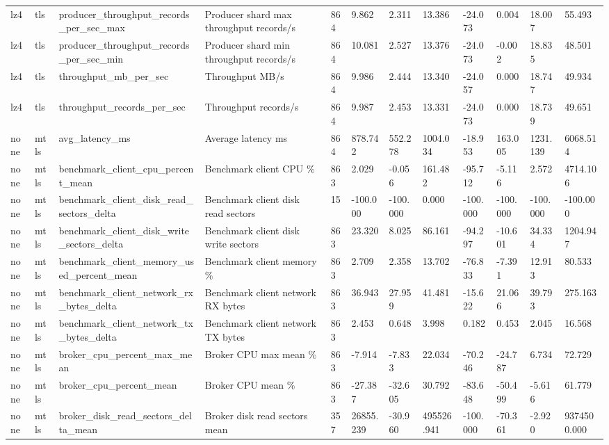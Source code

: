 \begin{longtable}{llllllllllll}
lz4 & tls & producer\_throughput\_records\_per\_sec\_max & Producer shard max throughput records/s & 864 & 9.862 & 2.311 & 13.386 & -24.073 & 0.004 & 18.007 & 55.493 \\
lz4 & tls & producer\_throughput\_records\_per\_sec\_min & Producer shard min throughput records/s & 864 & 10.081 & 2.527 & 13.376 & -24.073 & -0.002 & 18.835 & 48.501 \\
lz4 & tls & throughput\_mb\_per\_sec & Throughput MB/s & 864 & 9.986 & 2.444 & 13.340 & -24.057 & 0.000 & 18.747 & 49.934 \\
lz4 & tls & throughput\_records\_per\_sec & Throughput records/s & 864 & 9.987 & 2.453 & 13.331 & -24.073 & 0.000 & 18.739 & 49.651 \\
none & mtls & avg\_latency\_ms & Average latency ms & 864 & 878.742 & 552.278 & 1004.034 & -18.953 & 163.005 & 1231.139 & 6068.514 \\
none & mtls & benchmark\_client\_cpu\_percent\_mean & Benchmark client CPU \% & 863 & 2.029 & -0.056 & 161.482 & -95.712 & -5.116 & 2.572 & 4714.106 \\
none & mtls & benchmark\_client\_disk\_read\_sectors\_delta & Benchmark client disk read sectors & 15 & -100.000 & -100.000 & 0.000 & -100.000 & -100.000 & -100.000 & -100.000 \\
none & mtls & benchmark\_client\_disk\_write\_sectors\_delta & Benchmark client disk write sectors & 863 & 23.320 & 8.025 & 86.161 & -94.297 & -10.601 & 34.334 & 1204.947 \\
none & mtls & benchmark\_client\_memory\_used\_percent\_mean & Benchmark client memory \% & 863 & 2.709 & 2.358 & 13.702 & -76.833 & -7.391 & 12.913 & 80.533 \\
none & mtls & benchmark\_client\_network\_rx\_bytes\_delta & Benchmark client network RX bytes & 863 & 36.943 & 27.959 & 41.481 & -15.622 & 21.066 & 39.793 & 275.163 \\
none & mtls & benchmark\_client\_network\_tx\_bytes\_delta & Benchmark client network TX bytes & 863 & 2.453 & 0.648 & 3.998 & 0.182 & 0.453 & 2.045 & 16.568 \\
none & mtls & broker\_cpu\_percent\_max\_mean & Broker CPU max mean \% & 863 & -7.914 & -7.833 & 22.034 & -70.246 & -24.787 & 6.734 & 72.729 \\
none & mtls & broker\_cpu\_percent\_mean & Broker CPU mean \% & 863 & -27.387 & -32.605 & 30.792 & -83.648 & -50.499 & -5.616 & 61.779 \\
none & mtls & broker\_disk\_read\_sectors\_delta\_mean & Broker disk read sectors mean & 357 & 26855.239 & -30.960 & 495526.941 & -100.000 & -70.361 & -2.920 & 9374500.000 \\

\end{longtable}
